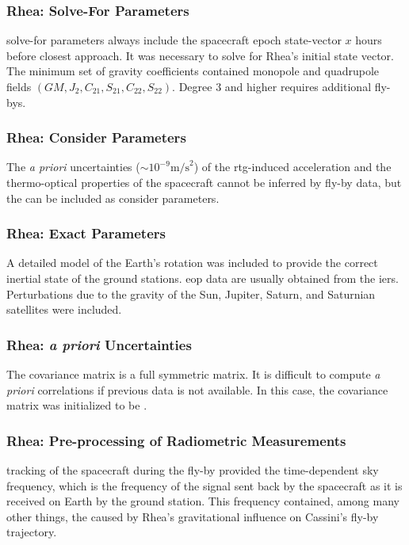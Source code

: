 \documentclass{article}
\theoremstyle{mystyle}
\begin{document}
\subsubsection{\footnotesize Rhea: Solve-For Parameters}

\noindent \Gls{solve-for parameters} always include the spacecraft epoch state-vector $x$ hours before closest approach. It was necessary to solve for Rhea's initial state vector. The minimum set of gravity coefficients contained \gls{monopole} and \gls{quadrupole} fields $(GM, J_2, C_{21}, S_{21}, C_{22}, S_{22})$. Degree $3$ and higher requires additional fly-bys.

\subsubsection{\footnotesize Rhea: Consider Parameters}

The \textit{a priori} uncertainties ($\sim 10^{-9}\textrm{m/s}^2$) of the \gls{rtg}-induced acceleration and the thermo-optical properties of the spacecraft cannot be inferred by fly-by data, but the can be included as \gls{consider parameters}. 

\subsubsection{\footnotesize Rhea: Exact Parameters}

A detailed model of the Earth's rotation was included to provide the correct inertial state of the ground stations. \gls{eop} data are usually obtained from the \gls{iers}. Perturbations due to the gravity of the Sun, Jupiter, Saturn, and Saturnian satellites were included.

\subsubsection{\footnotesize Rhea: \textit{a priori} Uncertainties} 
The \gls{covariance matrix} is a full \gls{symmetric matrix}. It is difficult to compute \textit{a priori} correlations if previous data is not available. In this case, the covariance matrix was initialized to be .

\subsubsection{\footnotesize Rhea: Pre-processing of Radiometric Measurements}

 tracking of the spacecraft during the fly-by provided the time-dependent \gls{sky frequency}, which is the frequency of the signal sent back by the spacecraft as it is received on Earth by the ground station. This frequency contained, among many other things, the  caused by Rhea’s gravitational influence on Cassini’s fly-by trajectory.
\end{document}
